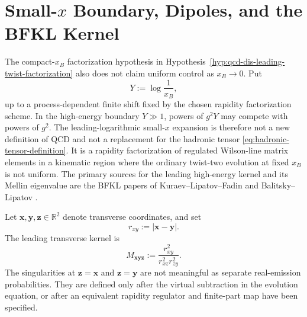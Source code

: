\section{\texorpdfstring{Small-\(x\) Boundary, Dipoles, and the BFKL Kernel}
{Small-x Boundary, Dipoles, and the BFKL Kernel}}
\label{sec:qcd-small-x-bfkl}

The compact-\(x_B\) factorization hypothesis in
Hypothesis~\ref{hyp:qcd-dis-leading-twist-factorization} also does not claim
uniform control as \(x_B\to0\).  Put
\[
  Y:=\log\frac1{x_B},
\]
up to a process-dependent finite shift fixed by the chosen rapidity
factorization scheme.  In the high-energy boundary \(Y\gg1\), powers of
\(g^2Y\) may compete with powers of \(g^2\).  The leading-logarithmic
small-\(x\) expansion is therefore not a new definition of QCD and not a
replacement for the hadronic tensor
\eqref{eq:hadronic-tensor-definition}.  It is a rapidity factorization of
regulated Wilson-line matrix elements in a kinematic region where the
ordinary twist-two evolution at fixed \(x_B\) is not uniform.
The primary sources for the leading high-energy kernel and its Mellin
eigenvalue are the BFKL papers of Kuraev--Lipatov--Fadin and
Balitsky--Lipatov
\cite{KuraevFadinLipatov1977,BalitskyLipatov1978}.

Let \(\mathbf x,\mathbf y,\mathbf z\in\mathbb R^2\) denote transverse
coordinates, and set
\[
  r_{xy}:=|\mathbf x-\mathbf y|.
\]
The leading transverse kernel is
\begin{equation}
  M_{\mathbf x\mathbf y\mathbf z}
  :=
  \frac{r_{xy}^2}{r_{xz}^2 r_{zy}^2}.
  \label{eq:qcd-dipole-transverse-kernel}
\end{equation}
The singularities at \(\mathbf z=\mathbf x\) and
\(\mathbf z=\mathbf y\) are not meaningful as separate real-emission
probabilities.  They are defined only after the virtual subtraction in the
evolution equation, or after an equivalent rapidity regulator and finite-part
map have been specified.

